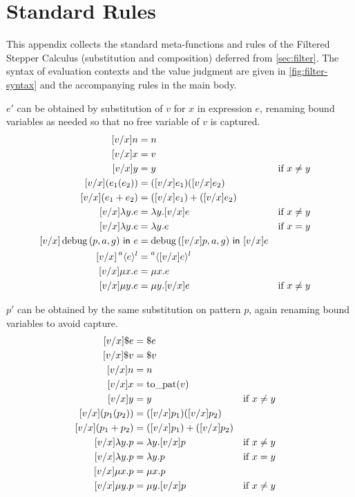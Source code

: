 \section{Standard Rules}\label{sec:standard_rules}

This appendix collects the standard meta-functions and rules of the
Filtered Stepper Calculus (substitution and composition) deferred from \autoref{sec:filter}. The syntax of
evaluation contexts and the value judgment are given in
\autoref{fig:filter-syntax} and the accompanying rules in the main
body.

 \(e'\) can be obtained by substitution of \(v\) for
\(x\) in expression \(e\), renaming bound variables as needed so that
no free variable of \(v\) is captured.
\[
  \begin{aligned}
    [v / x] \Nat{n} &= \Nat{n} \\
    [v / x] x &= v \\
    [v / x] y &= y && \text{if } x \neq y \\
    [v / x] (e_1(e_2)) &= ([v / x] e_1)([v / x] e_2) \\
    [v / x] (e_1 + e_2) &= ([v / x] e_1) + ([v / x] e_2) \\
    [v / x] \Lam{y}{e} &= \Lam{y}{[v / x] e} && \text{if } x \neq y \\
    [v / x] \Lam{y}{e} &= \Lam{y}{e} && \text{if } x = y \\
    [v / x] \Filter{(p, a, g)}{e} &= \Filter{([v / x]p, a, g)}{[v / x] e} \\
    [v / x] \Residue{a}{l}{e} &= \Residue{a}{l}{[v / x] e} \\
    [v / x] \Fix{x}{e} &= \Fix{x}{e} \\
    [v / x] \Fix{y}{e} &= \Fix{y}{[v / x]e} && \text{if } x \neq y
  \end{aligned}
\]

 \(p'\) can be obtained by the same substitution on
pattern \(p\), again renaming bound variables to avoid capture.
\[
  \begin{aligned}
    [v / x] \$e &= \$e \\
    [v / x] \$v &= \$v \\
    [v / x] \Nat{n} &= \Nat{n} \\
    [v / x] x &= \Patternize(v) \\
    [v / x] y &= y && \text{if } x \neq y \\
    [v / x] (p_1(p_2)) &= ([v / x] p_1)([v / x] p_2) \\
    [v / x] (p_1 + p_2) &= ([v / x] p_1) + ([v / x] p_2) \\
    [v / x] \Lam{y}{p} &= \Lam{y}{[v / x] p} && \text{if } x \neq y \\
    [v / x] \Lam{y}{p} &= \Lam{y}{p} && \text{if } x = y \\
    [v / x] \Fix{x}{p} &= \Fix{x}{p} \\
    [v / x] \Fix{y}{p} &= \Fix{y}{[v / x]p} && \text{if } x \neq y
  \end{aligned}
\]

